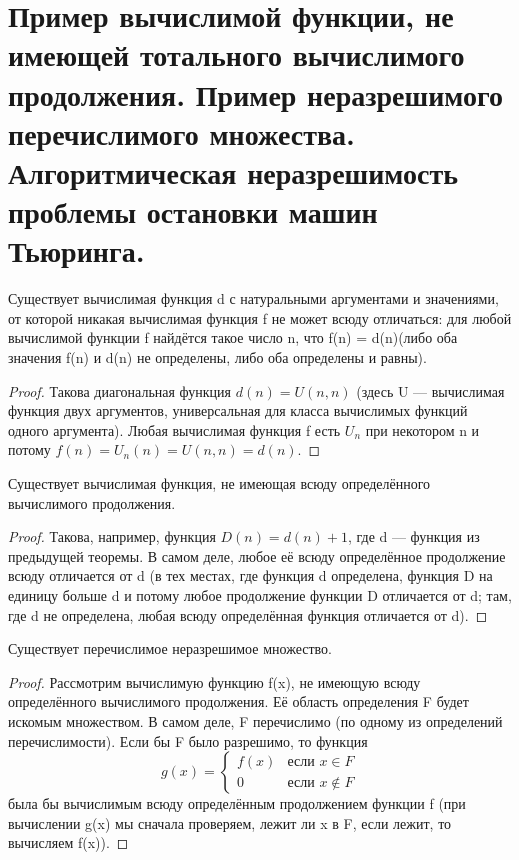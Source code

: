 \section{Пример вычислимой функции, не имеющей тотального вычислимого продолжения. Пример неразрешимого
перечислимого множества. Алгоритмическая неразрешимость проблемы остановки машин Тьюринга.}
\begin{theorem}
	Существует вычислимая функция d с натуральными аргументами и значениями, от которой никакая вычислимая функция
	f не может всюду отличаться: для любой вычислимой функции f найдётся такое число n, что f(n) = d(n)(либо оба
	значения f(n) и d(n) не определены, либо оба определены и равны).
\end{theorem}
\begin{proof}
	Такова диагональная функция $d(n) = U(n,n)$ (здесь U — вычислимая функция двух аргументов, универсальная для
	класса вычислимых функций одного аргумента). Любая вычислимая функция f есть $U_n$ при некотором n и потому
	$f(n) = U_n(n) = U(n,n) = d(n)$.
\end{proof}
\begin{theorem}
	Существует вычислимая функция, не имеющая всюду определённого вычислимого продолжения.
\end{theorem}
\begin{proof}
	Такова, например, функция $D(n) = d(n) + 1$, где d — функция из предыдущей теоремы. В самом деле, любое её
	всюду определённое продолжение всюду отличается от d (в тех местах, где функция d определена, функция D на
	единицу больше d и потому любое продолжение функции D отличается от d; там, где d не определена, любая всюду
	определённая функция отличается от d).
\end{proof}
\begin{theorem}
	Существует перечислимое неразрешимое множество.
\end{theorem}
\begin{proof}
	Рассмотрим вычислимую функцию f(x), не имеющую всюду определённого вычислимого продолжения. Её область
	определения F будет искомым множеством. В самом деле, F перечислимо (по одному из определений перечислимости).
	Если бы F было разрешимо, то функция
	\begin{equation*}
		g(x) = 
		\begin{cases}
			f(x) &\text{если $x \in F$}\\
			0 &\text{если $x \notin F$}
		\end{cases}
	\end{equation*} 
	была бы вычислимым всюду определённым продолжением функции f (при вычислении g(x) мы сначала проверяем, лежит
	ли x в F, если лежит, то вычисляем f(x)).
\end{proof}

